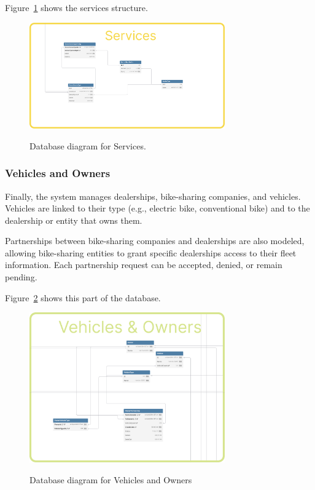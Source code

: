 Figure~\ref{fig:dbServices} shows the services structure.

\begin{figure}[h]
  \caption{Database diagram for Services.}
  \centering
  \includegraphics[width=0.75\textwidth]{figs/dbDiagrams/Services}
  \label{fig:dbServices}
\end{figure}


\subsubsection{Vehicles and Owners} 


Finally, the system manages dealerships, bike-sharing companies, and vehicles. Vehicles are linked to their type (e.g., electric bike, conventional bike) and to the dealership or entity that owns them.

Partnerships between bike-sharing companies and dealerships are also modeled, allowing bike-sharing entities to grant specific dealerships access to their fleet information. Each partnership request can be accepted, denied, or remain pending.

Figure~\ref{fig:dbVehicles} shows this part of the database.

\begin{figure}[h]
  \caption{Database diagram for Vehicles and Owners}
  \centering
  \includegraphics[width=0.75\textwidth]{figs/dbDiagrams/Vehicles_and_Owners}
  \label{fig:dbVehicles}
\end{figure}


